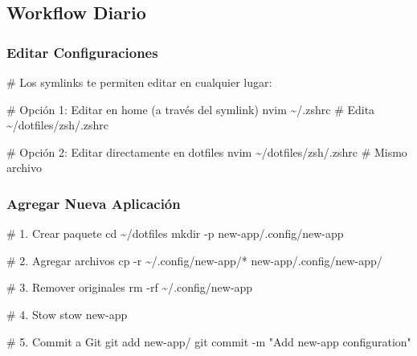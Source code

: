 \documentclass[
  doc,
  floatsintext,
  longtable,
  a4paper,
  nolmodern,
  notxfonts,
  notimes,
  12pt,
  colorlinks=true,linkcolor=blue,citecolor=blue,urlcolor=blue]{apa7}
\newenvironment{Shaded}{\begin{snugshade}}{\end{snugshade}}
\newcommand{\AttributeTok}[1]{\textcolor[rgb]{0.40,0.45,0.13}{#1}}
\newcommand{\BuiltInTok}[1]{\textcolor[rgb]{0.00,0.23,0.31}{#1}}
\newcommand{\CommentTok}[1]{\textcolor[rgb]{0.37,0.37,0.37}{#1}}
\newcommand{\ExtensionTok}[1]{\textcolor[rgb]{0.00,0.23,0.31}{#1}}
\newcommand{\FunctionTok}[1]{\textcolor[rgb]{0.28,0.35,0.67}{#1}}
\newcommand{\NormalTok}[1]{\textcolor[rgb]{0.00,0.23,0.31}{#1}}
\newcommand{\PreprocessorTok}[1]{\textcolor[rgb]{0.68,0.00,0.00}{#1}}
\newcommand{\StringTok}[1]{\textcolor[rgb]{0.13,0.47,0.30}{#1}}
\begin{document}
\subsection{Workflow Diario}\label{workflow-diario}

\subsubsection{Editar Configuraciones}\label{editar-configuraciones}

\begin{Shaded}
\begin{Highlighting}[]
\CommentTok{\# Los symlinks te permiten editar en cualquier lugar:}

\CommentTok{\# Opción 1: Editar en home (a través del symlink)}
\ExtensionTok{nvim}\NormalTok{ \textasciitilde{}/.zshrc              }\CommentTok{\# Edita \textasciitilde{}/dotfiles/zsh/.zshrc}

\CommentTok{\# Opción 2: Editar directamente en dotfiles}
\ExtensionTok{nvim}\NormalTok{ \textasciitilde{}/dotfiles/zsh/.zshrc }\CommentTok{\# Mismo archivo}
\end{Highlighting}
\end{Shaded}

\subsubsection{Agregar Nueva
Aplicación}\label{agregar-nueva-aplicaciuxf3n}

\begin{Shaded}
\begin{Highlighting}[]
\CommentTok{\# 1. Crear paquete}
\BuiltInTok{cd}\NormalTok{ \textasciitilde{}/dotfiles}
\FunctionTok{mkdir} \AttributeTok{{-}p}\NormalTok{ new{-}app/.config/new{-}app}

\CommentTok{\# 2. Agregar archivos}
\FunctionTok{cp} \AttributeTok{{-}r}\NormalTok{ \textasciitilde{}/.config/new{-}app/}\PreprocessorTok{*}\NormalTok{ new{-}app/.config/new{-}app/}

\CommentTok{\# 3. Remover originales}
\FunctionTok{rm} \AttributeTok{{-}rf}\NormalTok{ \textasciitilde{}/.config/new{-}app}

\CommentTok{\# 4. Stow}
\ExtensionTok{stow}\NormalTok{ new{-}app}

\CommentTok{\# 5. Commit a Git}
\FunctionTok{git}\NormalTok{ add new{-}app/}
\FunctionTok{git}\NormalTok{ commit }\AttributeTok{{-}m} \StringTok{"Add new{-}app configuration"}
\end{Highlighting}
\end{Shaded}
\end{document}
